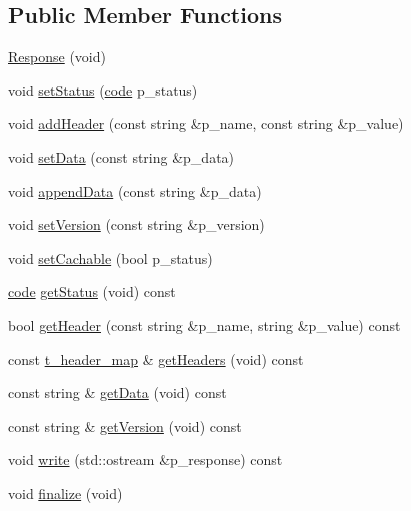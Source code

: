 \subsection*{Public Member Functions}
\begin{DoxyCompactItemize}
\item 
\hyperlink{classxtd_1_1network_1_1http_1_1Response_af4135d35d1d5c7e15b8ec11b0fee4510}{Response} (void)
\item 
void \hyperlink{classxtd_1_1network_1_1http_1_1Response_ae2a9c98f18509685efbd3b1c2dc40eee}{set\+Status} (\hyperlink{namespacextd_1_1network_1_1http_a55148922a7d13fe756e53e2ccad4b89c}{code} p\+\_\+status)
\item 
void \hyperlink{classxtd_1_1network_1_1http_1_1Response_a053c5cac11eae3d2280bd37e7b4c5777}{add\+Header} (const string \&p\+\_\+name, const string \&p\+\_\+value)
\item 
void \hyperlink{classxtd_1_1network_1_1http_1_1Response_abac2c9458d9552f9e615954a8d79c666}{set\+Data} (const string \&p\+\_\+data)
\item 
void \hyperlink{classxtd_1_1network_1_1http_1_1Response_a5c1dd78f683d9660cdb6f28a8ed4fd7c}{append\+Data} (const string \&p\+\_\+data)
\item 
void \hyperlink{classxtd_1_1network_1_1http_1_1Response_a9f4e8bb7eff6b869f87d59fe2ffbb224}{set\+Version} (const string \&p\+\_\+version)
\item 
void \hyperlink{classxtd_1_1network_1_1http_1_1Response_a0d6c9e21cc552494caae85314a723ae9}{set\+Cachable} (bool p\+\_\+status)
\item 
\hyperlink{namespacextd_1_1network_1_1http_a55148922a7d13fe756e53e2ccad4b89c}{code} \hyperlink{classxtd_1_1network_1_1http_1_1Response_a88aaaeda4df83751a5462746610033a1}{get\+Status} (void) const 
\item 
bool \hyperlink{classxtd_1_1network_1_1http_1_1Response_a7d8bdc82b82ed044802f1730552f1f07}{get\+Header} (const string \&p\+\_\+name, string \&p\+\_\+value) const 
\item 
const \hyperlink{classxtd_1_1network_1_1http_1_1Response_a77c534464429597bc4faa6bb556a8b53}{t\+\_\+header\+\_\+map} \& \hyperlink{classxtd_1_1network_1_1http_1_1Response_a46b741dc86559dd3207172056aca2565}{get\+Headers} (void) const 
\item 
const string \& \hyperlink{classxtd_1_1network_1_1http_1_1Response_a20be1955a089359fce4696150824698e}{get\+Data} (void) const 
\item 
const string \& \hyperlink{classxtd_1_1network_1_1http_1_1Response_ab80064478837b568a09f6dbcaebb1307}{get\+Version} (void) const 
\item 
void \hyperlink{classxtd_1_1network_1_1http_1_1Response_a9d561a52d0f3c852872532de31be7785}{write} (std\+::ostream \&p\+\_\+response) const 
\item 
void \hyperlink{classxtd_1_1network_1_1http_1_1Response_ae492d91828580c9421cf18a4efa92bba}{finalize} (void)
\end{DoxyCompactItemize}

